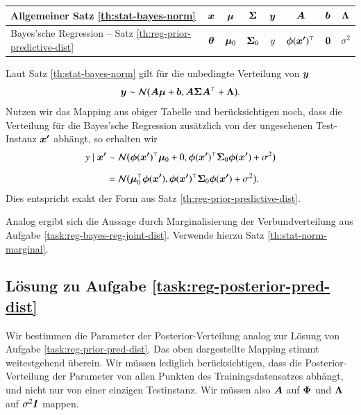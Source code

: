 {\renewcommand{\arraystretch}{1.3}
\begin{table}[h]
	\centering
	\begin{tabular}{| l | c | c | c | c | c | c | c |}
\hline
		Allgemeiner Satz \ref{th:stat-bayes-norm} &
		$\bm{x}$ &
		$\bm{\mu}$ &
		$\bm{\Sigma}$ &
		$\bm{y}$ &
		$\bm{A}$ &
		$\bm{b}$ &
		$\bm{\Lambda}$
\\ \hline
		Bayes'sche Regression -- Satz \ref{th:reg-prior-predictive-dist} &
		$\bm{\theta}$ &
		$\bm{\mu}_0$ &
		$\bm{\Sigma}_0$ &
		$y$ &
		$\bm{\phi}(\bm{x'})^\top$ &
		$\bm{0}$ &
		$\sigma^2$
\\ \hline
	\end{tabular}
\end{table}
}

Laut Satz \ref{th:stat-bayes-norm} gilt für die unbedingte Verteilung von $\bm{y}$
\begin{equation*}
	\bm{y} \sim \mathcal{N}\bigl( \bm{A} \bm{\mu} + \bm{b}, \bm{A} \bm{\Sigma} \bm{A}^\top + \bm{\Lambda} \bigr).
\end{equation*}
Nutzen wir das Mapping aus obiger Tabelle und berücksichtigen noch, dass die Verteilung für die Bayes'sche Regression zusätzlich von der ungesehenen Test-Instanz $\bm{x'}$ abhängt, so erhalten wir
\begin{align*}
	y \mid \bm{x'}
		&\sim \mathcal{N}\bigl( \bm{\phi}(\bm{x'})^\top \bm{\mu}_0 + 0, \bm{\phi}(\bm{x'})^\top \bm{\Sigma}_0 \bm{\phi}(\bm{x'}) + \sigma^2 \bigr)
\\[2mm]
		&= \mathcal{N}\bigl( \bm{\mu}_0^\top \bm{\phi}(\bm{x'}), \bm{\phi}(\bm{x'})^\top \bm{\Sigma}_0 \bm{\phi}(\bm{x'}) + \sigma^2 \bigr).
\end{align*}
Dies entspricht exakt der Form aus Satz \ref{th:reg-prior-predictive-dist}.

Analog ergibt sich die Aussage durch Marginalisierung der Verbundverteilung aus Aufgabe \ref{task:reg-bayes-reg-joint-dist}. Verwende hierzu Satz \ref{th:stat-norm-marginal}.

\subsection*{Lösung zu Aufgabe \ref{task:reg-posterior-pred-dist}}

Wir bestimmen die Parameter der Posterior-Verteilung analog zur Lösung von Aufgabe \ref{task:reg-prior-pred-dist}. Das oben dargestellte Mapping stimmt weitestgehend überein. Wir müssen lediglich berücksichtigen, dass die Posterior-Verteilung der Parameter von allen Punkten des Trainingsdatensatzes abhängt, und nicht nur von einer einzigen Testinstanz. Wir müssen also $\bm{A}$ auf $\bm{\Phi}$ und $\bm{\Lambda}$ auf $\sigma^2 \bm{I}$ mappen.

